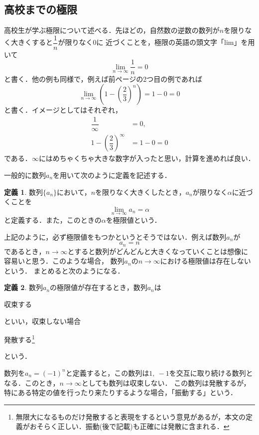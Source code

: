 \documentclass[a4paper,12pt,autodetect-engine,dvipdfmx]{jsarticle}
\theoremstyle{definition}
\newtheorem{dfn}{定義}[section]
\begin{document}
\subsection{高校までの極限}
高校生が学ぶ極限について述べる．先ほどの，自然数の逆数の数列が$n$を限りなく大きくすると$\dfrac{1}{n}$が限りなく0に
近づくことを，極限の英語の頭文字「lim」を用いて
\begin{equation*}
    \lim_{n \to \infty}\dfrac{1}{n} = 0
\end{equation*}
と書く．他の例も同様で，例えば前ページの2つ目の例であれば
\begin{equation*}
    \lim_{n \to \infty}\left(1 - \left(\dfrac{2}{3}\right)^{n}\right) = 1 - 0 = 0
\end{equation*}
と書く．イメージとしてはそれぞれ，
\begin{align*}
    \dfrac{1}{\infty} &= 0,\\
    1-\left(\dfrac{2}{3}\right)^{\infty} &= 1-0=0
\end{align*}
である．$\infty$にはめちゃくちゃ大きな数字が入ったと思い，計算を進めれば良い．

一般的に数列$a_{n}$を用いて次のように定義を記述する．
\begin{dfn}
    数列$\{a_{n}\}$において，$n$を限りなく大きくしたとき，$a_{n}$が限りなく$\alpha$に近づくことを
    \begin{equation*}
        \lim_{n \to \infty}a_{n} = \alpha
    \end{equation*}
と定義する．また，このときの$\alpha$を極限値という．
\end{dfn}
上記のように，必ず極限値をもつかというとそうではない．例えば数列$a_{n}$が
\begin{equation*}
    a_{n} = n
\end{equation*}
であるとき，$n \to \infty$とすると数列がどんどんと大きくなっていくことは想像に容易いと思う．このような場合，
数列$a_{n}$の$n \to \infty$における極限値は存在しないという．
まとめると次のようになる．
\begin{dfn}
    数列$a_{n}$の極限値が存在するとき，数列$a_{n}$は
    \begin{center}
        収束する
    \end{center}
    といい，収束しない場合
    \begin{center}
        発散する\footnote{無限大になるものだけ発散すると表現をするという意見があるが，本文の定義がおそらく正しい．振動(後で記載)も正確には発散に含まれる．}
    \end{center}
    という．
\end{dfn}
数列を$a_{n} = (-1)^n$と定義すると，この数列は$1,\ -1$を交互に取り続ける数列となる．このとき，$n \to \infty$としても数列は収束しない．
この数列は発散するが，特にある特定の値を行ったり来たりするような場合，「振動する」という．
\end{document}
